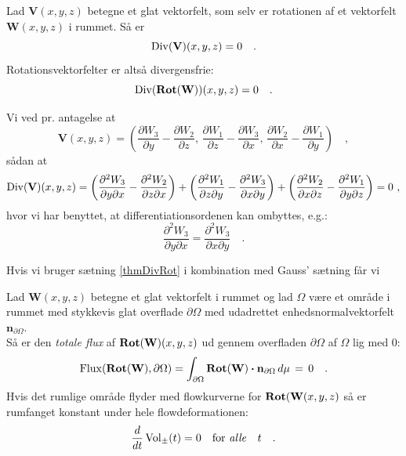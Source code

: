 \begin{theorem} \label{thmDivRot}
Lad $\mathbf{V}(x,y,z)$ betegne et glat vektorfelt, som selv er rotationen af et vektorfelt $\mathbf{W}(x,y,z)$ i rummet.
Så er
\begin{equation}
\operatorname{Div}(\mathbf{V})(x,y,z) = 0 \quad.
\end{equation}
Rotationsvektorfelter er altså divergensfrie:
\begin{equation}
\operatorname{Div}(\operatorname{\mathbf{Rot}}(\mathbf{W}))(x,y,z) = 0 \quad.
\end{equation}
\end{theorem}
\begin{bevis}
Vi ved pr. antagelse at
\begin{equation}
\mathbf{V}(x,y,z) = (\frac{\partial W_{3}}{\partial y} - \frac{\partial W_{2}}{\partial z}, \, \frac{\partial W_{1}}{\partial z} - \frac{\partial W_{3}}{\partial x}, \, \frac{\partial W_{2}}{\partial x} - \frac{\partial W_{1}}{\partial y}) \quad,
\end{equation}
sådan at
\begin{equation}
\operatorname{Div}(\mathbf{V})(x,y,z) = \left(\frac{\partial^{2} W_{3}}{\partial y \partial x } - \frac{\partial^{2} W_{2}}{\partial z \partial x }\right) + \left(\frac{\partial^{2} W_{1}}{\partial z \partial y} -\frac{\partial^{2} W_{3}}{\partial x \partial y}\right) + \left(\frac{\partial^{2} W_{2} }{\partial x \partial z } - \frac{\partial^{2} W_{1}}{\partial y \partial z}\right) = 0 \, \, ,
\end{equation}
hvor vi har benyttet, at differentiationsordenen kan ombyttes, e.g.:
\begin{equation}
\frac{\partial^{2} W_{3}}{\partial y \partial x } = \frac{\partial^{2} W_{3}}{\partial x \partial y } \quad .
\end{equation}
\end{bevis}

Hvis vi bruger sætning  \ref{thmDivRot} i kombination med Gauss' sætning får vi

\begin{corollary} \label{corTotFlux0}
Lad $\mathbf{W}(x,y,z)$ betegne et glat vektorfelt i rummet og lad $\Omega$ være et område i rummet med stykkevis glat overflade $\partial \Omega$ med udadrettet enhedsnormalvektorfelt $\mathbf{n}_{\partial \Omega}$. \\

Så er den \emph{totale flux} af $\operatorname{\mathbf{Rot}}(\mathbf{W})(x,y,z)$ ud gennem overfladen $\partial \Omega$ af $\Omega$ lig med $0$:
\begin{equation}
\operatorname{Flux}(\operatorname{\mathbf{Rot}}(\mathbf{W}), \partial \Omega) = \int_{\partial \Omega}\operatorname{\mathbf{Rot}}(\mathbf{W})\bm{\cdot} \mathbf{n}_{\partial \Omega} \, d\mu \, = \, 0 \quad .
\end{equation}
Hvis det rumlige område flyder med flowkurverne for $\operatorname{\mathbf{Rot}}(\mathbf{W}(x,y,z)$ så er rumfanget konstant under hele flowdeformationen:
\begin{equation}
\frac{d}{dt}\operatorname{Vol}_{\pm}(t) = 0 \quad \textrm{for \emph{alle}} \quad  t  \quad.
\end{equation}
\end{corollary}


